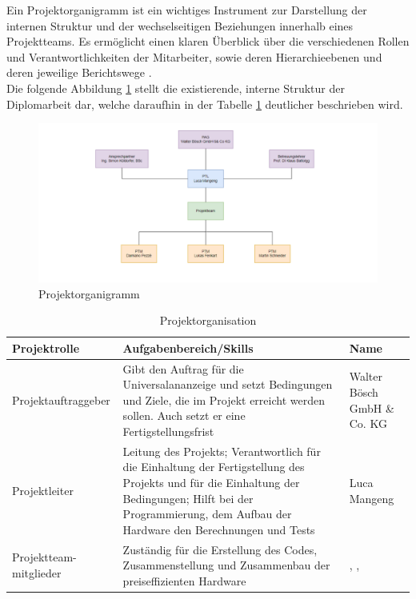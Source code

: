 Ein Projektorganigramm ist ein wichtiges Instrument zur Darstellung der internen Struktur und der wechselseitigen Beziehungen innerhalb eines Projektteams. Es ermöglicht einen klaren Überblick über die verschiedenen Rollen und Verantwortlichkeiten der Mitarbeiter, sowie deren Hierarchieebenen und deren jeweilige Berichtswege \cite[vgl.][]{projektmanagement-definitionen:2009}. \\
Die folgende Abbildung \ref{fig:organigramm} stellt die existierende, interne Struktur der Diplomarbeit dar, welche daraufhin in der Tabelle \ref{tab:projektorganisation} deutlicher beschrieben wird.

\begin{figure}[H]
	\centering
	\includegraphics[width=1\linewidth]{Bilder/Organigramm}
	\caption{Projektorganigramm}
	\label{fig:organigramm}
\end{figure}

\begin{table}[H]
	\caption{Projektorganisation}
	\label{tab:projektorganisation}
	\begin{tabular}{p{} | p{} | p{}}
		\toprule
		\textbf{Projektrolle} & \textbf{Aufgabenbereich/Skills} & \textbf{Name} \\
		\midrule
		Projektauftraggeber & Gibt den Auftrag für die Universalananzeige und setzt Bedingungen und Ziele, die im Projekt erreicht werden sollen. Auch setzt er eine Fertigstellungsfrist & Walter Bösch GmbH \& Co. KG
		\\
		\midrule
		Projektleiter & Leitung des Projekts;
		Verantwortlich für die Einhaltung der Fertigstellung des Projekts und für die Einhaltung der Bedingungen; Hilft bei der Programmierung, dem Aufbau der Hardware den Berechnungen und Tests
		 & Luca Mangeng
		\\
		\midrule
		Projektteam-mitglieder & Zuständig für die Erstellung des Codes, Zusammenstellung und Zusammenbau der preiseffizienten Hardware & 
		\fenkart, \pezze, \schneider
		\\
		\bottomrule
	\end{tabular}
\end{table}